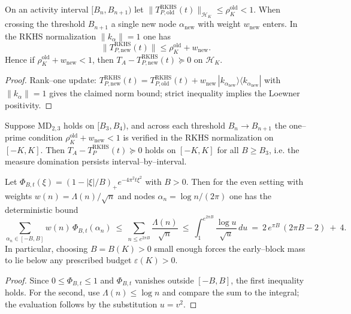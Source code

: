 \begin{theorem}[B.3: IND/AB]\label{md:thm:INDprime}
On an activity interval $[B_n,B_{n+1})$ let $\|T_{P,\mathrm{old}}^{\mathrm{RKHS}}(t)\|_{\mathcal H_K}\le \rho_K^{\mathrm{old}}<1$. When crossing the threshold $B_{n+1}$ a single new node $\alpha_{\mathrm{new}}$ with weight $w_{\mathrm{new}}$ enters. In the RKHS normalization $\|k_{\alpha}\|=1$ one has
\begin{equation}\label{eq:IND_prime_step-formula-1}
\|T_{P,\mathrm{new}}^{\mathrm{RKHS}}(t)\|\le \rho_K^{\mathrm{old}}+ w_{\mathrm{new}}.
\end{equation}
Hence if $\rho_K^{\mathrm{old}}+w_{\mathrm{new}}<1$, then $T_A-T_{P,\mathrm{new}}^{\mathrm{RKHS}}(t)\succeq 0$ on $\mathcal H_K$.
\end{theorem}
\begin{proof}
Rank--one update: $T_{P,\mathrm{new}}^{\mathrm{RKHS}}(t)=T_{P,\mathrm{old}}^{\mathrm{RKHS}}(t)+ w_{\mathrm{new}}\,|k_{\alpha_{\mathrm{new}}}\rangle\langle k_{\alpha_{\mathrm{new}}}|$ with $\|k_{\alpha}\|=1$ gives the claimed norm bound; strict inequality implies the Loewner positivity.
\end{proof}


\begin{corollary}\label{md:cor:IND-glue}
Suppose MD$_{2,3}$ holds on $[B_3,B_4)$, and across each threshold $B_{n}\to B_{n+1}$ the one--prime condition $\rho_K^{\mathrm{old}}+w_{\mathrm{new}}<1$ is verified in the RKHS normalization on $[-K,K]$. Then $T_A-T_P^{\mathrm{RKHS}}(t)\succeq 0$ holds on $[-K,K]$ for all $B\ge B_3$, i.e. the measure domination persists interval--by--interval.
\end{corollary}

\begin{lemma}\label{md:lem:IND-early-analytic}
Let $\Phi_{B,t}(\xi)=(1-|\xi|/B)_+e^{-4\pi^2 t\xi^2}$ with $B>0$. Then for the even setting with weights $w(n)=\Lambda(n)/\sqrt n$ and nodes $\alpha_n=\log n/(2\pi)$ one has the deterministic bound
\begin{equation}\label{eq:IND_prime_step-formula}
 \sum_{\alpha_n\in[-B,B]} w(n)\,\Phi_{B,t}(\alpha_n)\ \le\ \sum_{n\le e^{2\pi B}} \frac{\Lambda(n)}{\sqrt n}\ \le\ \int_1^{e^{2\pi B}} \frac{\log u}{\sqrt u}\,du\ =\ 2\,e^{\pi B}\,(2\pi B-2)\ +\ 4.
\end{equation}
In particular, choosing $B=B(K)>0$ small enough forces the early--block mass to lie below any prescribed budget $\varepsilon(K)>0$.
\end{lemma}
\begin{proof}
Since $0\le \Phi_{B,t}\le1$ and $\Phi_{B,t}$ vanishes outside $[-B,B]$, the first inequality holds. For the second, use $\Lambda(n)\le\log n$ and compare the sum to the integral; the evaluation follows by the substitution $u=v^2$.
\end{proof}
